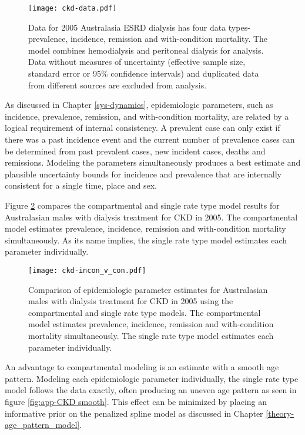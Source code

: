     \begin{figure}[h]
        \begin{center}
            \texttt{[image: ckd-data.pdf]}
            \caption{Data for 2005 Australasia ESRD dialysis has four data types-prevalence, incidence, remission and with-condition mortality.  The model combines hemodialysis and peritoneal dialysis for analysis.  Data without measures of uncertainty (effective sample size, standard error or 95\% confidence intervals) and duplicated data from different sources are excluded from analysis.}
            \label{fig:app-CKD data}
        \end{center}
    \end{figure}

As discussed in Chapter \ref{sys-dynamics}, epidemiologic parameters, such as incidence, prevalence, remission, and with-condition mortality, are related by a logical requirement of internal consistency.  A prevalent case can only exist if there was a past incidence event and the current number of prevalence cases can be determined from past prevalent cases, new incident cases, deaths and remissions.  Modeling the parameters simultaneously produces a best estimate and plausible uncertainty bounds for incidence and prevalence that are internally consistent for a single time, place and sex.

Figure \ref{fig:app-CKD incon v con} compares the compartmental and single rate type model results for Australasian males with dialysis treatment for CKD in 2005.  The compartmental model estimates prevalence, incidence, remission and with-condition mortality simultaneously.  As its name implies, the single rate type model estimates each parameter individually.

    \begin{figure}[h]
        \begin{center}
            \texttt{[image: ckd-incon\_v\_con.pdf]}
            \caption{Comparison of epidemiologic parameter estimates for Australasian males with dialysis treatment for CKD in 2005 using the compartmental and single rate type models.  The compartmental model estimates prevalence, incidence, remission and with-condition mortality simultaneously.  The single rate type model estimates each parameter individually.}
            \label{fig:app-CKD incon v con}
        \end{center}
    \end{figure}

An advantage to compartmental modeling is an estimate with a smooth age pattern. Modeling each epidemiologic parameter individually, the single rate type model follows the data exactly, often producing an uneven age pattern as seen in figure \ref{fig:app-CKD smooth}.  This effect can be minimized by placing an informative prior on the penalized spline model as discussed in Chapter \ref{theory-age_pattern_model}.

